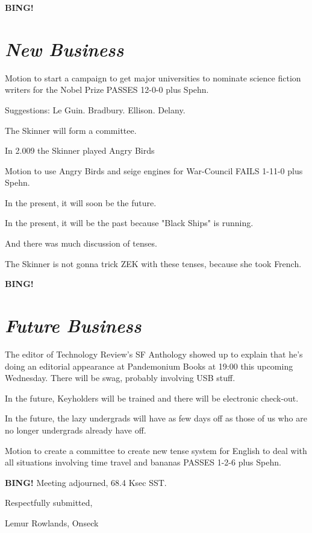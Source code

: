 \documentclass[10pt]{article}
\newcommand{\bing}{{\bf BING!} }
\newcommand{\goto}[1]{\bing \vskip 12pt \section*{{\em{#1}}}}
\newcommand{\ps}{ plus Spehn\xspace}
\newcommand{\onseck}{Lemur Rowlands, Onseck}
\begin{document}
\goto{New Business}

Motion to start a campaign to get major universities to
nominate science fiction writers for the Nobel Prize PASSES 12-0-0\ps.

Suggestions: Le Guin.  Bradbury.  Ellison.  Delany.

The Skinner will form a committee. 

In 2.009 the Skinner played Angry Birds 

Motion to use Angry Birds and seige engines for War-Council
FAILS 1-11-0\ps.

In the present, it will soon be the future.

In the present, it will be the past because "Black Ships" is running.

And there was much discussion of tenses.

The Skinner is not gonna trick ZEK with these tenses, because she took French.

\goto{Future Business}

The editor of Technology Review's SF Anthology showed up to explain that he's
doing an editorial appearance at Pandemonium Books at 19:00 this upcoming Wednesday.
There will be swag, probably involving USB stuff.

In the future, Keyholders will be trained and there will be electronic check-out.

In the future, the lazy undergrads will have as few days off as those of us
who are no longer undergrads already have off.

Motion to create a committee to create new tense system for English
to deal with all situations involving time travel and bananas PASSES 1-2-6\ps.

\bing
\noindent
Meeting adjourned, 68.4 Ksec SST.

\vspace{18pt}

\centerline{Respectfully submitted,}
\centerline{\onseck}
\end{document}
